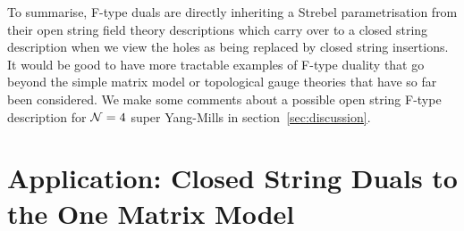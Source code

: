 \documentclass[english]{article}
\begin{document}



%         
%         


To summarise, F-type duals are directly inheriting a Strebel parametrisation from their open string field theory descriptions which carry over to a closed string description when we view the holes as being replaced by closed string insertions. 
It would be good to have more tractable examples of F-type duality that go beyond the simple matrix model or topological gauge theories that have so far been considered. We make some comments about a possible open string F-type description for ${\cal N}=4$ super Yang-Mills in section~\ref{sec:discussion}.

\pagebreak

\part{Application: Closed String Duals to the One Matrix Model}
\end{document}
